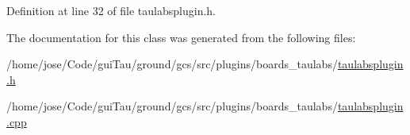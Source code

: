 Definition at line 32 of file taulabsplugin.\-h.



The documentation for this class was generated from the following files\-:\begin{DoxyCompactItemize}
\item 
/home/jose/\-Code/gui\-Tau/ground/gcs/src/plugins/boards\-\_\-taulabs/\hyperlink{taulabsplugin_8h}{taulabsplugin.\-h}\item 
/home/jose/\-Code/gui\-Tau/ground/gcs/src/plugins/boards\-\_\-taulabs/\hyperlink{taulabsplugin_8cpp}{taulabsplugin.\-cpp}\end{DoxyCompactItemize}
